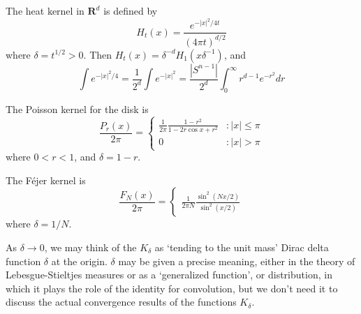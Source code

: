 \begin{example}
    The heat kernel in $\mathbf{R}^d$ is defined by
    \[ H_t(x) = \frac{e^{-|x|^2/4t}}{(4 \pi t)^{d/2}} \]
    where $\delta = t^{1/2} > 0$. Then $H_t(x) = \delta^{-d} H_1(x\delta^{-1})$, and
    \[ \int e^{-|x|^2/4} = \frac{1}{2^d} \int e^{-|x|^2} = \frac{|S^{n-1}|}{2^d} \int_0^\infty r^{d-1} e^{-r^2} dr \]
\end{example}

\begin{example}
    The Poisson kernel for the disk is
    \[ \frac{P_r(x)}{2 \pi} = \begin{cases} \frac{1}{2\pi} \frac{1 - r^2}{1 - 2r \cos x + r^2} &: |x| \leq \pi \\ 0 &: |x| > \pi \end{cases} \]
    where $0 < r < 1$, and $\delta = 1-r$.
\end{example}

\begin{example}
    The F\'{e}jer kernel is
    \[ \frac{F_N(x)}{2 \pi} = \begin{cases} \frac{1}{2 \pi N} \frac{\sin^2(Nx/2)}{\sin^2(x/2)} \end{cases} \]
    where $\delta = 1/N$.
\end{example}

As $\delta \to 0$, we may think of the $K_\delta$ as `tending to the unit mass' Dirac delta function $\delta$ at the origin. $\delta$ may be given a precise meaning, either in the theory of Lebesgue-Stieltjes measures or as a `generalized function', or distribution, in which it plays the role of the identity for convolution, but we don't need it to discuss the actual convergence results of the functions $K_\delta$.

